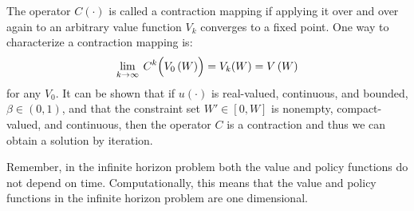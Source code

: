 The operator $C(\cdot)$ is called a contraction mapping if applying it over and over again to an arbitrary value function $V_k$ converges to a fixed point. One way to characterize a contraction mapping is:
\begin{equation*}
\lim_{k\rightarrow\infty}\: C^k\Bigl(V_0\left(W\right)\Bigr) = V_k(W) =  V\left(W\right)
\end{equation*}
for any $V_0$.  It can be shown that if $u(\cdot)$ is real-valued, continuous, and bounded, $\beta\in(0,1)$, and that the constraint set $W'\in[0,W]$ is nonempty, compact-valued, and continuous, then the operator $C$ is a contraction and thus we can obtain a solution by iteration.

Remember, in the infinite horizon problem both the value and policy functions do not depend on time.  Computationally, this means that the value and policy functions in the infinite horizon problem are one dimensional.

